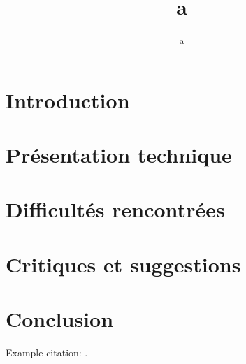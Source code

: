 \documentclass[12pt]{article}
\author{a}
\title{a}
\begin{document}

\setcounter{page}{1}

\tableofcontents

\section{Introduction}

\section{Présentation technique}
\section{Difficultés rencontrées}
\section{Critiques et suggestions}
\section{Conclusion}
Example citation: .



\end{document}
